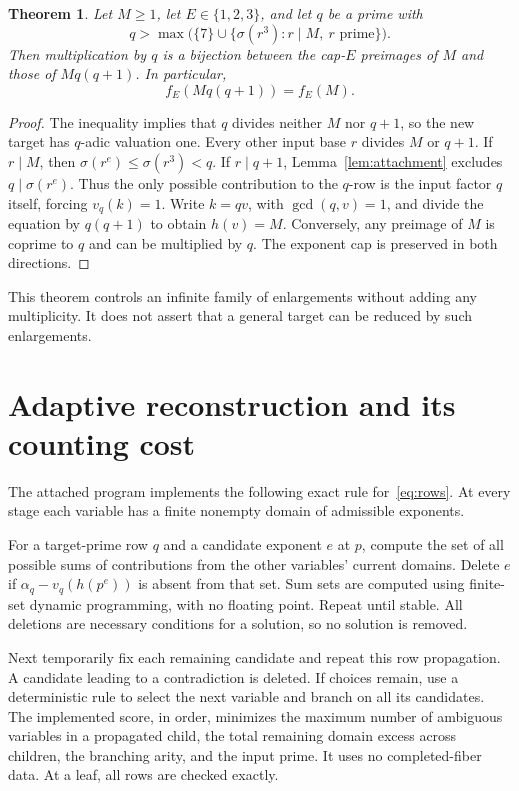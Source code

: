 \documentclass[11pt]{article}
\newtheorem{theorem}{Theorem}[section]
\begin{document}
\begin{theorem}\label{thm:lift}
Let $M\ge1$, let $E\in\{1,2,3\}$, and let $q$ be a prime with
\[
 q>\max\bigl(\{7\}\cup\{\sigma(r^3):r\mid M,\ r\text{ prime}\}\bigr).
\]
Then multiplication by $q$ is a bijection between the cap-$E$ preimages of $M$ and those of $Mq(q+1)$. In particular,
\[
 \boxed{f_E(Mq(q+1))=f_E(M).}
\]
\end{theorem}
\begin{proof}
The inequality implies that $q$ divides neither $M$ nor $q+1$, so the new target has $q$-adic valuation one. Every other input base $r$ divides $M$ or $q+1$. If $r\mid M$, then $\sigma(r^e)\le\sigma(r^3)<q$. If $r\mid q+1$, Lemma~\ref{lem:attachment} excludes $q\mid\sigma(r^e)$. Thus the only possible contribution to the $q$-row is the input factor $q$ itself, forcing $v_q(k)=1$. Write $k=qv$, with $\gcd(q,v)=1$, and divide the equation by $q(q+1)$ to obtain $h(v)=M$. Conversely, any preimage of $M$ is coprime to $q$ and can be multiplied by $q$. The exponent cap is preserved in both directions.
\end{proof}

This theorem controls an infinite family of enlargements without adding any multiplicity. It does not assert that a general target can be reduced by such enlargements.

\section{Adaptive reconstruction and its counting cost}
The attached program implements the following exact rule for~\eqref{eq:rows}. At every stage each variable has a finite nonempty domain of admissible exponents.

For a target-prime row $q$ and a candidate exponent $e$ at $p$, compute the set of all possible sums of contributions from the other variables' current domains. Delete $e$ if $\alpha_q-v_q(h(p^e))$ is absent from that set. Sum sets are computed using finite-set dynamic programming, with no floating point. Repeat until stable. All deletions are necessary conditions for a solution, so no solution is removed.

Next temporarily fix each remaining candidate and repeat this row propagation. A candidate leading to a contradiction is deleted. If choices remain, use a deterministic rule to select the next variable and branch on all its candidates. The implemented score, in order, minimizes the maximum number of ambiguous variables in a propagated child, the total remaining domain excess across children, the branching arity, and the input prime. It uses no completed-fiber data. At a leaf, all rows are checked exactly.
\end{document}
